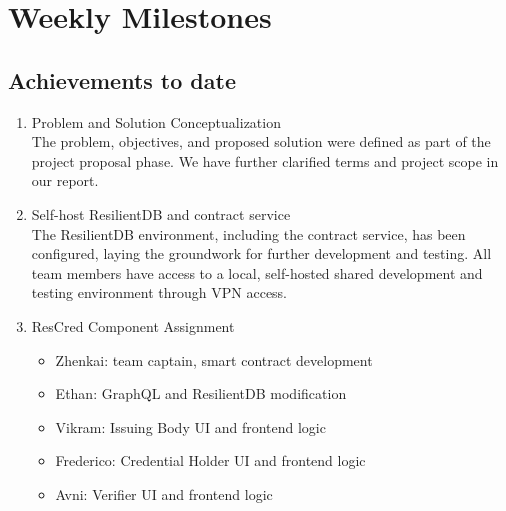 \section{Weekly Milestones}

\subsection{Achievements to date}
\begin{enumerate}
    \item Problem and Solution Conceptualization \\
        The problem, objectives, and proposed solution were defined as part of the project proposal phase.
        We have further clarified terms and project scope in our report.
    \item Self-host ResilientDB and contract service \\
        The ResilientDB environment, including the contract service, has been configured, laying the groundwork for further development and testing. All team members have access to a local, self-hosted shared development and testing environment through VPN access.
    \item ResCred Component Assignment 
        \begin{itemize}
            \item Zhenkai: team captain, smart contract development
            \item Ethan: GraphQL and ResilientDB modification
            \item Vikram: Issuing Body UI and frontend logic
            \item Frederico: Credential Holder UI and frontend logic
            \item Avni: Verifier UI and frontend logic
        \end{itemize}
\end{enumerate}



